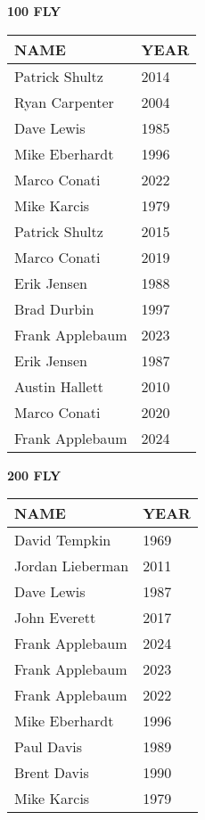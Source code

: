 \vspace{0.4cm}

\begin{minipage}[t]{0.48\textwidth}
\centering
\textbf{100 FLY}\\[0.05cm]
\begin{tabular}{@{}p{2.8cm}p{1.2cm}@{}}
\hline
\textbf{NAME} & \textbf{YEAR} \\
\hline
Patrick Shultz & 2014 \\
Ryan Carpenter & 2004 \\
Dave Lewis & 1985 \\
Mike Eberhardt & 1996 \\
Marco Conati & 2022 \\
Mike Karcis & 1979 \\
Patrick Shultz & 2015 \\
Marco Conati & 2019 \\
Erik Jensen & 1988 \\
Brad Durbin & 1997 \\
Frank Applebaum & 2023 \\
Erik Jensen & 1987 \\
Austin Hallett & 2010 \\
Marco Conati & 2020 \\
Frank Applebaum & 2024 \\
\hline
\end{tabular}
\end{minipage}\hfill
\begin{minipage}[t]{0.48\textwidth}
\centering
\textbf{200 FLY}\\[0.05cm]
\begin{tabular}{@{}p{2.8cm}p{1.2cm}@{}}
\hline
\textbf{NAME} & \textbf{YEAR} \\
\hline
David Tempkin & 1969 \\
Jordan Lieberman & 2011 \\
Dave Lewis & 1987 \\
John Everett & 2017 \\
Frank Applebaum & 2024 \\
Frank Applebaum & 2023 \\
Frank Applebaum & 2022 \\
Mike Eberhardt & 1996 \\
Paul Davis & 1989 \\
Brent Davis & 1990 \\
Mike Karcis & 1979 \\
\hline
\end{tabular}
\end{minipage}

